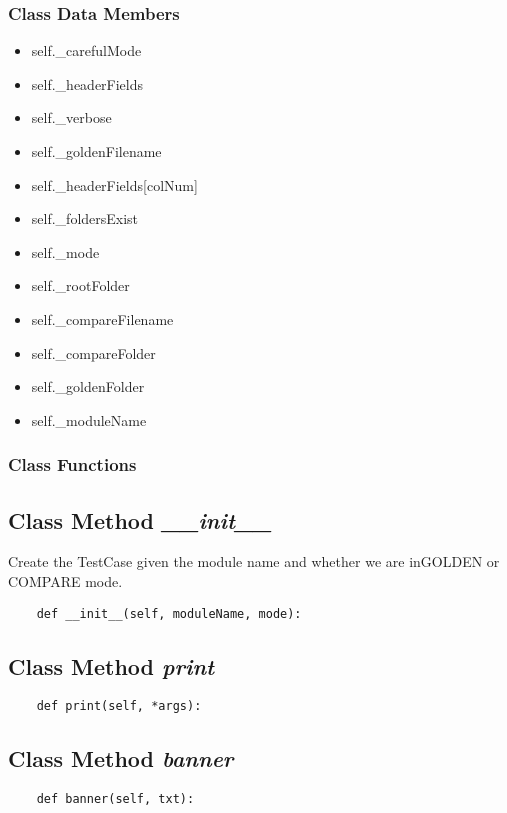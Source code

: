 \documentclass[twoside,11pt]{book}
\begin{document}
\subsubsection{Class Data Members}
\begin{itemize}
\item{self.\_carefulMode}
\item{self.\_headerFields}
\item{self.\_verbose}
\item{self.\_goldenFilename}
\item{self.\_headerFields[colNum]}
\item{self.\_foldersExist}
\item{self.\_mode}
\item{self.\_rootFolder}
\item{self.\_compareFilename}
\item{self.\_compareFolder}
\item{self.\_goldenFolder}
\item{self.\_moduleName}
\end{itemize}

\subsubsection{Class Functions}

\subsection{Class Method {\it \_\_init\_\_}}
Create the TestCase given the module name and whether we are inGOLDEN or COMPARE mode. 

\begin{lstlisting}
    def __init__(self, moduleName, mode):
\end{lstlisting}

\subsection{Class Method {\it print}}


\begin{lstlisting}
    def print(self, *args):
\end{lstlisting}

\subsection{Class Method {\it banner}}


\begin{lstlisting}
    def banner(self, txt):
\end{lstlisting}
\end{document}
